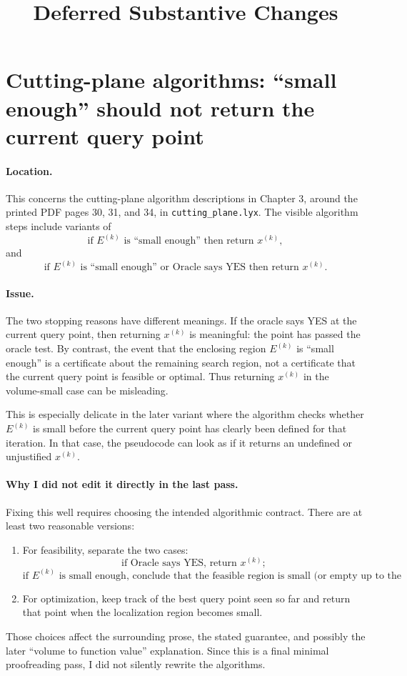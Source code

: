 \documentclass{article}
\title{Deferred Substantive Changes}
\author{}
\date{}
\begin{document}
\maketitle

\section*{Cutting-plane algorithms: ``small enough'' should not return the current query point}

\paragraph{Location.}
This concerns the cutting-plane algorithm descriptions in Chapter 3, around the
printed PDF pages 30, 31, and 34, in \texttt{cutting\_plane.lyx}.  The visible
algorithm steps include variants of
\[
\text{if } E^{(k)} \text{ is ``small enough'' then return } x^{(k)},
\]
and
\[
\text{if } E^{(k)} \text{ is ``small enough'' or Oracle says YES then return } x^{(k)}.
\]

\paragraph{Issue.}
The two stopping reasons have different meanings.  If the oracle says YES at
the current query point, then returning \(x^{(k)}\) is meaningful: the point has
passed the oracle test.  By contrast, the event that the enclosing region
\(E^{(k)}\) is ``small enough'' is a certificate about the remaining search
region, not a certificate that the current query point is feasible or optimal.
Thus returning \(x^{(k)}\) in the volume-small case can be misleading.

This is especially delicate in the later variant where the algorithm checks
whether \(E^{(k)}\) is small before the current query point has clearly been
defined for that iteration.  In that case, the pseudocode can look as if it
returns an undefined or unjustified \(x^{(k)}\).

\paragraph{Why I did not edit it directly in the last pass.}
Fixing this well requires choosing the intended algorithmic contract.  There
are at least two reasonable versions:
\begin{enumerate}
\item For feasibility, separate the two cases:
\[
\text{if Oracle says YES, return } x^{(k)};
\]
\[
\text{if } E^{(k)} \text{ is small enough, conclude that the feasible region is
small (or empty up to the chosen tolerance).}
\]
\item For optimization, keep track of the best query point seen so far and
return that point when the localization region becomes small.
\end{enumerate}
Those choices affect the surrounding prose, the stated guarantee, and possibly
the later ``volume to function value'' explanation.  Since this is a final
minimal proofreading pass, I did not silently rewrite the algorithms.
\end{document}
